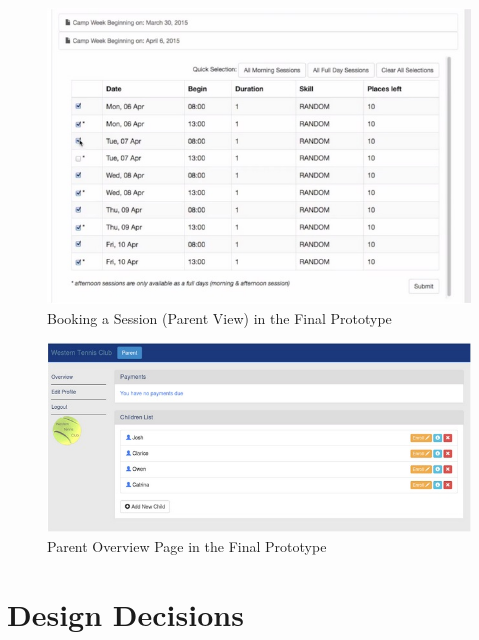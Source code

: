 \documentclass{l3proj}
\begin{document}
{
\begin{figure}[h]
\caption{Booking a Session (Parent View) in the Final Prototype}
\centering
\includegraphics[scale=0.55]{parenttableFinal.jpg}
\end{figure}
}
{
\begin{figure}[h]
\caption{Parent Overview Page in the Final Prototype}
\centering
\includegraphics[scale=0.55]{parentlistofchildren.jpg}
\end{figure}
}
\section{Design Decisions}

\end{document}
